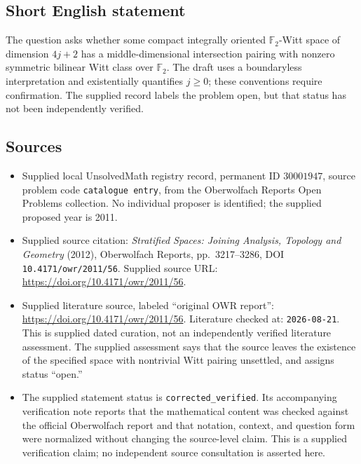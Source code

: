 \documentclass[11pt]{article}
\newcommand{\F}{\mathbb{F}}
\begin{document}
\subsection{Short English statement}
The question asks whether some compact integrally oriented \(\F_2\)-Witt space of dimension \(4j+2\) has a middle-dimensional intersection pairing with nonzero symmetric bilinear Witt class over \(\F_2\). The draft uses a boundaryless interpretation and existentially quantifies \(j\geq0\); these conventions require confirmation. The supplied record labels the problem open, but that status has not been independently verified.
\subsection{Sources}
\begin{itemize}
\item Supplied local UnsolvedMath registry record, permanent ID \(30001947\), source problem code \texttt{catalogue entry}, from the Oberwolfach Reports Open Problems collection. No individual proposer is identified; the supplied proposed year is 2011.
\item Supplied source citation: \emph{Stratified Spaces: Joining Analysis, Topology and Geometry} (2012), Oberwolfach Reports, pp.\ 3217--3286, DOI \texttt{10.4171/owr/2011/56}. Supplied source URL: \url{https://doi.org/10.4171/owr/2011/56}.
\item Supplied literature source, labeled ``original OWR report'': \url{https://doi.org/10.4171/owr/2011/56}. Literature checked at: \texttt{2026-08-21}. This is supplied dated curation, not an independently verified literature assessment. The supplied assessment says that the source leaves the existence of the specified space with nontrivial Witt pairing unsettled, and assigns status ``open.''
\item The supplied statement status is \texttt{corrected\_verified}. Its accompanying verification note reports that the mathematical content was checked against the official Oberwolfach report and that notation, context, and question form were normalized without changing the source-level claim. This is a supplied verification claim; no independent source consultation is asserted here.
\end{itemize}
\end{document}
